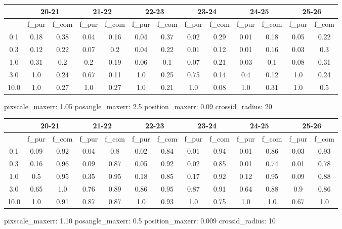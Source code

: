 \documentclass{article}
\begin{document}
\begin{figure}[H]
\centering
\begin{tabular}{|c|c|c|c|c|c|c|c|c|c|c|c|c|}
\hline
\multicolumn{1}{|c|}{} & \multicolumn{2}{|c|}{20-21} & \multicolumn{2}{|c|}{21-22} & \multicolumn{2}{|c|}{22-23} & \multicolumn{2}{|c|}{23-24} & \multicolumn{2}{|c|}{24-25} & \multicolumn{2}{|c|}{25-26}\\
\hline \hline
 & f\_pur & f\_com & f\_pur & f\_com & f\_pur & f\_com & f\_pur & f\_com & f\_pur & f\_com & f\_pur & f\_com \\
\hline
0.1 & 0.18 & 0.38 & 0.04 & 0.16 & 0.04 & 0.37 & 0.02 & 0.29 & 0.01 & 0.18 & 0.05 & 0.22\\
\hline
0.3 & 0.12 & 0.22 & 0.07 & 0.2 & 0.04 & 0.22 & 0.01 & 0.12 & 0.01 & 0.16 & 0.03 & 0.3\\
\hline
1.0 & 0.31 & 0.2 & 0.2 & 0.19 & 0.06 & 0.1 & 0.07 & 0.21 & 0.03 & 0.1 & 0.08 & 0.31\\
\hline
3.0 & 1.0 & 0.24 & 0.67 & 0.11 & 1.0 & 0.25 & 0.75 & 0.14 & 0.4 & 0.12 & 1.0 & 0.24\\
\hline
10.0 & 1.0 & 0.27 & 1.0 & 0.27 & 1.0 & 0.21 & 1.0 & 0.08 & 1.0 & 0.31 & 1.0 & 0.5\\
\hline
\end{tabular}
\caption{pixscale\_maxerr: 1.05 posangle\_maxerr: 2.5 position\_maxerr: 0.09 crossid\_radius: 20}
\end{figure}

\begin{figure}[H]
\centering
\begin{tabular}{|c|c|c|c|c|c|c|c|c|c|c|c|c|}
\hline
\multicolumn{1}{|c|}{} & \multicolumn{2}{|c|}{20-21} & \multicolumn{2}{|c|}{21-22} & \multicolumn{2}{|c|}{22-23} & \multicolumn{2}{|c|}{23-24} & \multicolumn{2}{|c|}{24-25} & \multicolumn{2}{|c|}{25-26}\\
\hline \hline
 & f\_pur & f\_com & f\_pur & f\_com & f\_pur & f\_com & f\_pur & f\_com & f\_pur & f\_com & f\_pur & f\_com \\
\hline
0.1 & 0.09 & 0.92 & 0.04 & 0.8 & 0.02 & 0.84 & 0.01 & 0.94 & 0.01 & 0.86 & 0.03 & 0.93\\
\hline
0.3 & 0.16 & 0.96 & 0.09 & 0.87 & 0.05 & 0.92 & 0.02 & 0.85 & 0.01 & 0.74 & 0.01 & 0.78\\
\hline
1.0 & 0.5 & 0.95 & 0.35 & 0.95 & 0.18 & 0.85 & 0.17 & 0.92 & 0.12 & 0.95 & 0.09 & 0.88\\
\hline
3.0 & 0.65 & 1.0 & 0.76 & 0.89 & 0.86 & 0.95 & 0.87 & 0.91 & 0.64 & 0.88 & 0.9 & 0.86\\
\hline
10.0 & 1.0 & 0.91 & 0.87 & 0.87 & 1.0 & 0.93 & 1.0 & 0.75 & 1.0 & 1.0 & 0.67 & 1.0\\
\hline
\end{tabular}
\caption{pixscale\_maxerr: 1.10 posangle\_maxerr: 0.5 position\_maxerr: 0.009 crossid\_radius: 10}
\end{figure}
\end{document}
